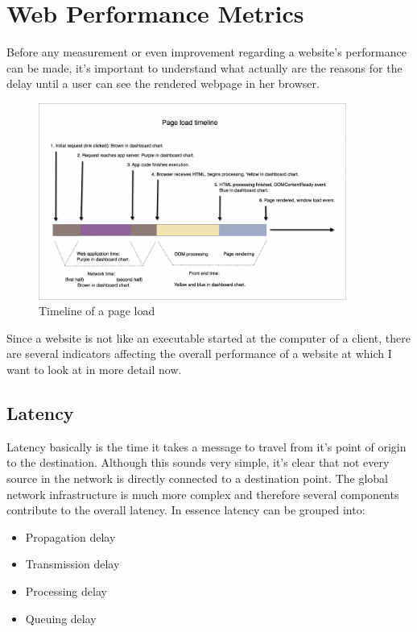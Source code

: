 \chapter{Web Performance Metrics}
\label{chap:metrics}
Before any measurement or even improvement regarding a website's performance can be made, it's important to understand what actually are the reasons for the delay until a user can see the rendered webpage in her browser. 
\begin{figure}[h]
	\centering
      		\includegraphics[width=0.9\textwidth]{imgs/timeline}
  	\caption{Timeline of a page load \cite{NewRelic_Load}}
\end{figure}
Since a website is not like an executable started at the computer of a client, there are several indicators affecting the overall performance of a website at which I want to look at in more detail now.  

\section{Latency}
Latency basically is the time it takes a message to travel from it's point of origin to the destination. Although this sounds very simple, it's clear that not every source in the network is directly connected to a destination point. The global network infrastructure is much more complex and therefore several components contribute to the overall latency. In essence latency can be grouped into:
\begin{itemize}
	\item{Propagation delay}
	\item{Transmission delay}
	\item{Processing delay}
	\item{Queuing delay}
\end{itemize}

